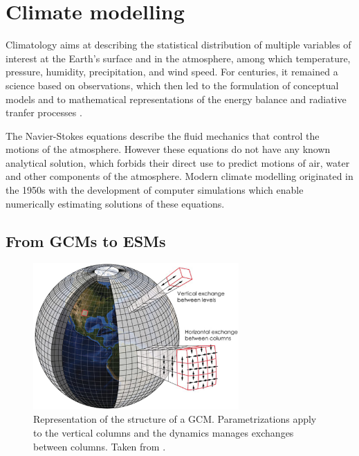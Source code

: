 \clearpage
\section{Climate modelling}
Climatology aims at describing the statistical distribution of multiple variables of interest at the Earth's surface and in the atmosphere, among which temperature, pressure, humidity, precipitation, and wind speed.
For centuries, it remained a science based on observations, 
which then led to the formulation of conceptual models and to mathematical representations of the energy balance and radiative tranfer processes \citep{edwards_history_2011}.

The Navier-Stokes equations describe the fluid mechanics that control the motions of the atmosphere. However these equations do not have any known analytical solution, which forbids their direct use to predict motions of air, water and other components of the atmosphere. 
Modern climate modelling originated in the 1950s with the development of computer simulations which enable numerically estimating solutions of these equations.

\subsection{From GCMs to ESMs}

\begin{figure}[hbtp]
    \centering
    \includegraphics[width=0.7\textwidth]{images/intro/GCM_structure_kotamarthi.png}
    \caption{Representation of the structure of a GCM. Parametrizations apply to the vertical columns and the dynamics manages exchanges between columns. Taken from \citep{kotamarthi_downscaling_2021}. 
    }
    \label{fig:GCM}
\end{figure}

